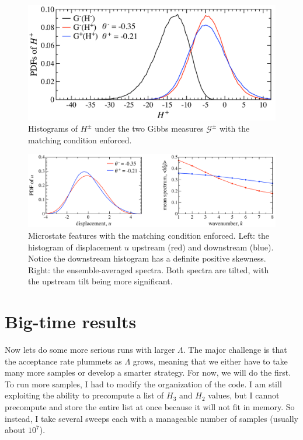 \documentclass[12pt]{article}
\newcommand{\np}{\newpage \noindent}
\newcommand{\Gibbs}{\mathcal{G}}
\begin{document}
\begin{figure}%
\begin{center}
\includegraphics[width = 0.75 \textwidth]{matchH}
\caption{Histograms of $H^\pm$ under the two Gibbs measures $\Gibbs^{\pm}$ with the matching condition enforced.}
\label{matchH}
\end{center}
\end{figure}
 
\begin{figure}%
\begin{center}
\includegraphics[width = 0.95 \textwidth]{match_micro}
\caption{Microstate features with the matching condition enforced. Left: the histogram of displacement $u$ upstream (red) and downstream (blue). Notice the downstream histogram has a definite positive skewness. Right: the ensemble-averaged spectra. Both spectra are tilted, with the upstream tilt being more significant.}
\label{match_micro}
\end{center}
\end{figure}

\np
\section{Big-time results}

Now lets do some more serious runs with larger $\Lambda$. The major challenge is that the acceptance rate plummets as $\Lambda$ grows, meaning that we either have to take many more samples or develop a smarter strategy. For now, we will do the first. To run more samples, I had to modify the organization of the code. I am still exploiting the ability to precompute a list of $H_3$ and $H_2$ values, but I cannot precompute and store the entire list at once because it will not fit in memory. So instead, I take several sweeps each with a manageable number of samples (usually about $10^7$).
\end{document}
